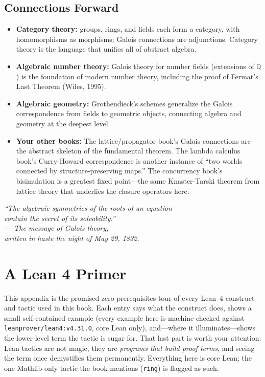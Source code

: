 \documentclass[11pt, a4paper, oneside]{book}
\newcommand{\Q}{\mathbb{Q}}
\newcommand{\lc}[1]{\texttt{#1}}
\begin{document}
\section{Connections Forward}

\begin{itemize}[nosep]
\item \textbf{Category theory:} groups, rings, and fields each form a category,
  with homomorphisms as morphisms; Galois connections are adjunctions. Category
  theory is the language that unifies all of abstract algebra.
\item \textbf{Algebraic number theory:} Galois theory for number fields
  (extensions of $\Q$) is the foundation of modern number theory, including
  the proof of Fermat's Last Theorem (Wiles, 1995).
\item \textbf{Algebraic geometry:} Grothendieck's schemes generalize the
  Galois correspondence from fields to geometric objects, connecting algebra
  and geometry at the deepest level.
\item \textbf{Your other books:} The lattice/propagator book's Galois
  connections are the abstract skeleton of the fundamental theorem.
  The lambda calculus book's Curry-Howard correspondence is another instance
  of ``two worlds connected by structure-preserving maps.'' The concurrency
  book's bisimulation is a greatest fixed point---the same Knaster-Tarski
  theorem from lattice theory that underlies the closure operators here.
\end{itemize}

\vfill
\begin{center}
\Large\itshape\color{deepblue}
``The algebraic symmetries of the roots of an equation\\
contain the secret of its solvability.''\\[0.5cm]
\normalsize --- The message of Galois theory,\\
written in haste the night of May 29, 1832.
\end{center}
\vfill

\appendix

\chapter{A Lean 4 Primer}\label{app:primer}

This appendix is the promised zero-prerequisites tour of every Lean~4 construct
and tactic used in this book. Each entry says what the construct does, shows a
small self-contained example (every example here is machine-checked against
\texttt{leanprover/lean4:v4.31.0}, core Lean only), and---where it
illuminates---shows the lower-level term the tactic is sugar for. That last part
is worth your attention: Lean tactics are not magic, they are \emph{programs that
build proof terms}, and seeing the term once demystifies them permanently.
Everything here is core Lean; the one Mathlib-only tactic the book mentions
(\lc{ring}) is flagged as such.
\end{document}
